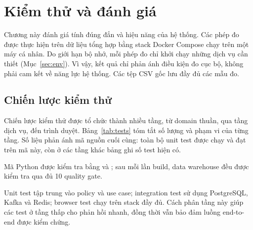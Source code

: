 \chapter{Kiểm thử và đánh giá}
\label{chap:eval}

Chương này đánh giá tính đúng đắn và hiệu năng của hệ thống. Các phép đo được thực hiện trên dữ liệu tổng hợp bằng stack Docker Compose chạy trên một máy cá nhân. Do giới hạn bộ nhớ, mỗi phép đo chỉ khởi chạy những dịch vụ cần thiết (Mục~\ref{sec:env}). Vì vậy, kết quả chỉ phản ánh điều kiện đo cục bộ, không phải cam kết về năng lực hệ thống. Các tệp CSV gốc lưu đầy đủ các mẫu đo.

\section{Chiến lược kiểm thử}

Chiến lược kiểm thử được tổ chức thành nhiều tầng, từ domain thuần, qua tầng dịch vụ, đến trình duyệt. Bảng~\ref{tab:tests} tóm tắt số lượng và phạm vi của từng tầng. Số liệu phản ánh mã nguồn cuối cùng: toàn bộ unit test được chạy và đạt trên mã này, còn ở các tầng khác bảng ghi số test hiện có.

Mã Python được kiểm tra bằng  và ; sau mỗi lần build, data warehouse đều được kiểm tra qua đủ 10 quality gate.

Unit test tập trung vào policy và use case; integration test sử dụng PostgreSQL, Kafka và Redis; browser test chạy trên stack đầy đủ. Cách phân tầng này giúp các test ở tầng thấp cho phản hồi nhanh, đồng thời vẫn bảo đảm luồng end-to-end được kiểm chứng.

